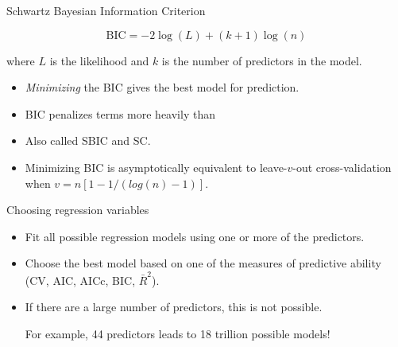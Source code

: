 \documentclass[14pt]{beamer}
\makeatletter
\def\biz{\begin{itemize}[<+-| alert@+>]}
\def\eiz{\end{itemize}}
\makeatother
\begin{document}
\begin{frame}{\normalsize Schwartz Bayesian Information Criterion}

\begin{block}{}
\[
\text{BIC} = -2\log(L) + (k+1)\log(n)
\]
\end{block}
where $L$ is the likelihood and $k$ is the number of predictors in the model.\pause

\biz
\item \emph{Minimizing} the BIC gives the best model for prediction.

\item BIC penalizes terms more heavily than 

\item Also called SBIC and SC.

\item Minimizing BIC is asymptotically equivalent to leave-$v$-out cross-validation when $v = n[1-1/(log(n)-1)]$.

\eiz

\end{frame}


\begin{frame}{Choosing regression variables}


\biz
\item
Fit all possible regression models using one or more of the predictors.

\item
Choose the best model based on one of the measures of predictive ability (CV, AIC, AICc, BIC, $\bar{R}^2$).
\eiz

\vfill\pause

\begin{itemize}
\item If there are a large number of predictors, this is not possible.

For example, 44 predictors leads to 18 trillion possible models!
\end{itemize}

\end{frame}
\end{document}
